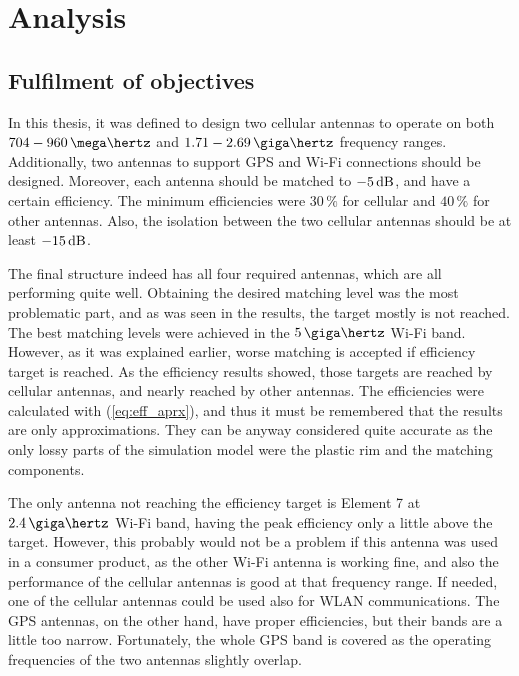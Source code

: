 \section{Analysis}
\label{sec:analysis}


\subsection{Fulfilment of objectives}
\label{sec:fulfilment}
In this thesis, it was defined to design two cellular antennas to operate on both $704-960\,\mega\hertz$ and $1.71-2.69\,\giga\hertz$ frequency ranges. Additionally, two antennas to support GPS and Wi-Fi connections should be designed. Moreover, each antenna should be matched to $-5\,\mathrm{dB}$, and have a certain efficiency. The minimum efficiencies were $30\,\%$ for cellular and $40\,\%$ for other antennas. Also, the isolation between the two cellular antennas should be at least $-15\,\mathrm{dB}$.

The final structure indeed has all four required antennas, which are all performing quite well. Obtaining the desired matching level was the most problematic part, and as was seen in the results, the target mostly is not reached. The best matching levels were achieved in the $5\,\giga\hertz$ Wi-Fi band. However, as it was explained earlier, worse matching is accepted if efficiency target is reached. As the efficiency results showed, those targets are reached by cellular antennas, and nearly reached by other antennas. The efficiencies were calculated with (\ref{eq:eff_aprx}), and thus it must be remembered that the results are only approximations. They can be anyway considered quite accurate as the only lossy parts of the simulation model were the plastic rim and the matching components. 

The only antenna not reaching the efficiency target is Element 7 at $2.4\,\giga\hertz$ Wi-Fi band, having the peak efficiency only a little above the target. However, this probably would not be a problem if this antenna was used in a consumer product, as the other Wi-Fi antenna is working fine, and also the performance of the cellular antennas is good at that frequency range. If needed, one of the cellular antennas could be used also for WLAN communications. The GPS antennas, on the other hand, have proper efficiencies, but their bands are a little too narrow. Fortunately, the whole GPS band is covered as the operating frequencies of the two antennas slightly overlap.

